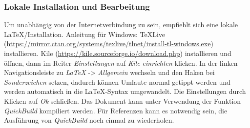 \documentclass[./main.tex]{subfiles}
\begin{document}
\subsubsection{Lokale Installation und Bearbeitung}
Um unabh\"angig von der Internetverbindung zu sein, empfiehlt sich eine lokale \LaTeX\-/Installation. Anleitung f\"ur Windows: TeXLive (\url{https://mirror.ctan.org/systems/texlive/tlnet/install-tl-windows.exe}) installieren. Kile (\url{https://kile.sourceforge.io/download.php}) installieren und \"offnen, dann im Reiter \textit{Einstellungen} auf \textit{Kile einrichten} klicken. In der linken Navigationsleiste zu \textit{LaTeX} -> \textit{Allgemein} wechseln und den Haken bei \textit{Sonderzeichen} setzen, dadurch k\"onnen Umlaute normal getippt werden und werden automatisch in die \LaTeX-Syntax umgewandelt. Die Einstellungen durch Klicken auf \textit{Ok} schlie\ss{}en. Das Dokument kann unter Verwendung der Funktion \textit{QuickBuild} kompiliert werden. F\"ur Referenzen kann es notwendig sein, die Ausf\"uhrung von \textit{QuickBuild} noch einmal zu wiederholen.
\end{document}
